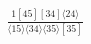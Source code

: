 \documentclass[varwidth, border=5pt]{standalone}
\begin{document}
\begin{my}
$\begin{gathered}
\scriptscriptstyle\frac{1[45][34]⟨24⟩}{⟨15⟩⟨34⟩⟨35⟩[35]}
\end{gathered}$
\end{my}
\end{document}
